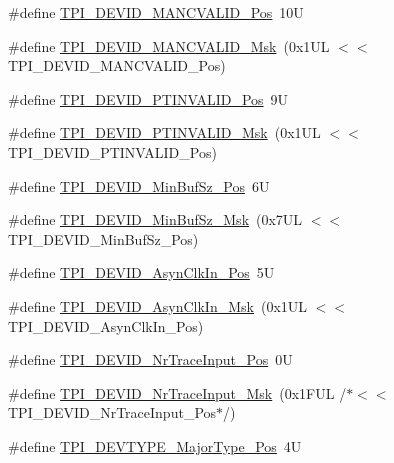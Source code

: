 \begin{DoxyCompactItemize}
\item 
\#define \hyperlink{group___c_m_s_i_s___t_p_i_ga675534579d9e25477bb38970e3ef973c}{T\-P\-I\-\_\-\-D\-E\-V\-I\-D\-\_\-\-M\-A\-N\-C\-V\-A\-L\-I\-D\-\_\-\-Pos}~10\-U
\item 
\#define \hyperlink{group___c_m_s_i_s___t_p_i_ga4c3ee4b1a34ad1960a6b2d6e7e0ff942}{T\-P\-I\-\_\-\-D\-E\-V\-I\-D\-\_\-\-M\-A\-N\-C\-V\-A\-L\-I\-D\-\_\-\-Msk}~(0x1\-U\-L $<$$<$ T\-P\-I\-\_\-\-D\-E\-V\-I\-D\-\_\-\-M\-A\-N\-C\-V\-A\-L\-I\-D\-\_\-\-Pos)
\item 
\#define \hyperlink{group___c_m_s_i_s___t_p_i_ga974cccf4c958b4a45cb71c7b5de39b7b}{T\-P\-I\-\_\-\-D\-E\-V\-I\-D\-\_\-\-P\-T\-I\-N\-V\-A\-L\-I\-D\-\_\-\-Pos}~9\-U
\item 
\#define \hyperlink{group___c_m_s_i_s___t_p_i_ga1ca84d62243e475836bba02516ba6b97}{T\-P\-I\-\_\-\-D\-E\-V\-I\-D\-\_\-\-P\-T\-I\-N\-V\-A\-L\-I\-D\-\_\-\-Msk}~(0x1\-U\-L $<$$<$ T\-P\-I\-\_\-\-D\-E\-V\-I\-D\-\_\-\-P\-T\-I\-N\-V\-A\-L\-I\-D\-\_\-\-Pos)
\item 
\#define \hyperlink{group___c_m_s_i_s___t_p_i_ga3f7da5de2a34be41a092e5eddd22ac4d}{T\-P\-I\-\_\-\-D\-E\-V\-I\-D\-\_\-\-Min\-Buf\-Sz\-\_\-\-Pos}~6\-U
\item 
\#define \hyperlink{group___c_m_s_i_s___t_p_i_ga939e068ff3f1a65b35187ab34a342cd8}{T\-P\-I\-\_\-\-D\-E\-V\-I\-D\-\_\-\-Min\-Buf\-Sz\-\_\-\-Msk}~(0x7\-U\-L $<$$<$ T\-P\-I\-\_\-\-D\-E\-V\-I\-D\-\_\-\-Min\-Buf\-Sz\-\_\-\-Pos)
\item 
\#define \hyperlink{group___c_m_s_i_s___t_p_i_gab382b1296b5efd057be606eb8f768df8}{T\-P\-I\-\_\-\-D\-E\-V\-I\-D\-\_\-\-Asyn\-Clk\-In\-\_\-\-Pos}~5\-U
\item 
\#define \hyperlink{group___c_m_s_i_s___t_p_i_gab67830557d2d10be882284275025a2d3}{T\-P\-I\-\_\-\-D\-E\-V\-I\-D\-\_\-\-Asyn\-Clk\-In\-\_\-\-Msk}~(0x1\-U\-L $<$$<$ T\-P\-I\-\_\-\-D\-E\-V\-I\-D\-\_\-\-Asyn\-Clk\-In\-\_\-\-Pos)
\item 
\#define \hyperlink{group___c_m_s_i_s___t_p_i_ga80ecae7fec479e80e583f545996868ed}{T\-P\-I\-\_\-\-D\-E\-V\-I\-D\-\_\-\-Nr\-Trace\-Input\-\_\-\-Pos}~0\-U
\item 
\#define \hyperlink{group___c_m_s_i_s___t_p_i_gabed454418d2140043cd65ec899abd97f}{T\-P\-I\-\_\-\-D\-E\-V\-I\-D\-\_\-\-Nr\-Trace\-Input\-\_\-\-Msk}~(0x1\-F\-U\-L /$\ast$$<$$<$ T\-P\-I\-\_\-\-D\-E\-V\-I\-D\-\_\-\-Nr\-Trace\-Input\-\_\-\-Pos$\ast$/)
\item 
\#define \hyperlink{group___c_m_s_i_s___t_p_i_ga69c4892d332755a9f64c1680497cebdd}{T\-P\-I\-\_\-\-D\-E\-V\-T\-Y\-P\-E\-\_\-\-Major\-Type\-\_\-\-Pos}~4\-U

\end{DoxyCompactItemize}
